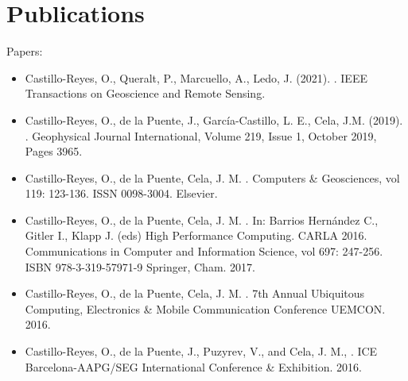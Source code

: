 \documentclass[letterpaper,10pt,english]{sphinxmanual}
\begin{document}
\chapter{Publications}
\label{\detokenize{Publications:publications}}\label{\detokenize{Publications:id1}}\label{\detokenize{Publications::doc}}
Papers:
\begin{itemize}
\item {} 
Castillo-Reyes, O., Queralt, P., Marcuello, A., Ledo, J. (2021). . IEEE Transactions on Geoscience and Remote Sensing.

\item {} 
Castillo-Reyes, O., de la Puente, J., García-Castillo, L. E., Cela, J.M. (2019). . Geophysical Journal International, Volume 219, Issue 1, October 2019, Pages 39\textendash{}65.

\item {} 
Castillo-Reyes, O., de la Puente, Cela, J. M. . Computers \& Geosciences, vol 119: 123-136. ISSN 0098-3004. Elsevier.

\item {} 
Castillo-Reyes, O., de la Puente, Cela, J. M. . In: Barrios Hernández C., Gitler I., Klapp J. (eds) High Performance Computing. CARLA 2016. Communications in Computer and Information Science, vol 697: 247-256. ISBN 978-3-319-57971-9 Springer, Cham. 2017.

\item {} 
Castillo-Reyes, O., de la Puente, Cela, J. M. . 7th Annual Ubiquitous Computing, Electronics \& Mobile Communication Conference \textendash{} UEMCON. 2016.

\item {} 
Castillo-Reyes, O., de la Puente, J., Puzyrev, V., and Cela, J. M., . ICE Barcelona-AAPG/SEG International Conference \& Exhibition. 2016.


\end{itemize}
\end{document}
